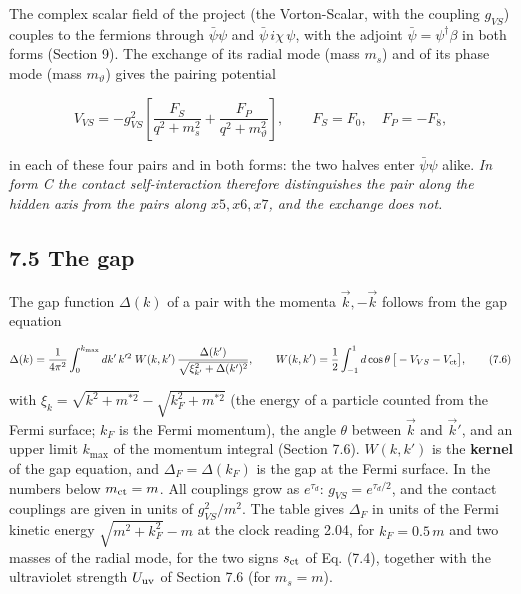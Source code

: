 \documentclass[
  10pt,
]{article}
\begin{document}
The complex scalar field of the project (the Vorton-Scalar, with the
coupling \(g_{VS}\)) couples to the fermions through \(\bar\psi\psi\)
and \(\bar\psi\,i\chi\,\psi\), with the adjoint
\(\bar\psi=\psi^\dagger\beta\) in both forms (Section 9). The exchange
of its radial mode (mass \(m_s\)) and of its phase mode (mass
\(m_\vartheta\)) gives the pairing potential

\[V_{VS}=-g_{VS}^2\left[\frac{F_S}{q^2+m_s^2}+\frac{F_P}{q^2+m_\vartheta^2}\right],\qquad
F_S=F_0,\quad F_P=-F_8,\tag{7.5}\]

in each of these four pairs and in both forms: the two halves enter
\(\bar\psi\psi\) alike. \emph{In form C the contact self-interaction
therefore distinguishes the pair along the hidden axis from the pairs
along \(x5,x6,x7\), and the exchange does not.}

\hypertarget{the-gap}{%
\subsection{7.5 The gap}\label{the-gap}}

The gap function \(\Delta(k)\) of a pair with the momenta
\(\vec k,-\vec k\) follows from the gap equation

\[\Delta(k)=\frac1{4\pi^2}\int_0^{k_{\max}}dk'\,k'^2\;W(k,k')\,\frac{\Delta(k')}{\sqrt{\xi_{k'}^2+\Delta(k')^2}},\qquad
W(k,k')=\frac12\int_{-1}^{1}d\cos\theta\,\big[-V_{VS}-V_{\rm ct}\big],\tag{7.6}\]

with \(\xi_k=\sqrt{k^2+m^{*2}}-\sqrt{k_F^2+m^{*2}}\) (the energy of a
particle counted from the Fermi surface; \(k_F\) is the Fermi momentum),
the angle \(\theta\) between \(\vec k\) and \(\vec k'\), and an upper
limit \(k_{\max}\) of the momentum integral (Section 7.6). \(W(k,k')\)
is the \textbf{kernel} of the gap equation, and \(\Delta_F=\Delta(k_F)\)
is the gap at the Fermi surface. In the numbers below \(m_{\rm ct}=m\).
All couplings grow as \(e^{\tau_d}\): \(g_{VS}=e^{\tau_d/2}\), and the
contact couplings are given in units of \(g_{VS}^2/m^2\). The table
gives \(\Delta_F\) in units of the Fermi kinetic energy
\(\sqrt{m^2+k_F^2}-m\) at the clock reading 2.04, for \(k_F=0.5\,m\) and
two masses of the radial mode, for the two signs \(s_{\rm ct}\) of Eq.
(7.4), together with the ultraviolet strength \(U_{\rm uv}\) of Section
7.6 (for \(m_s=m\)).
\end{document}
